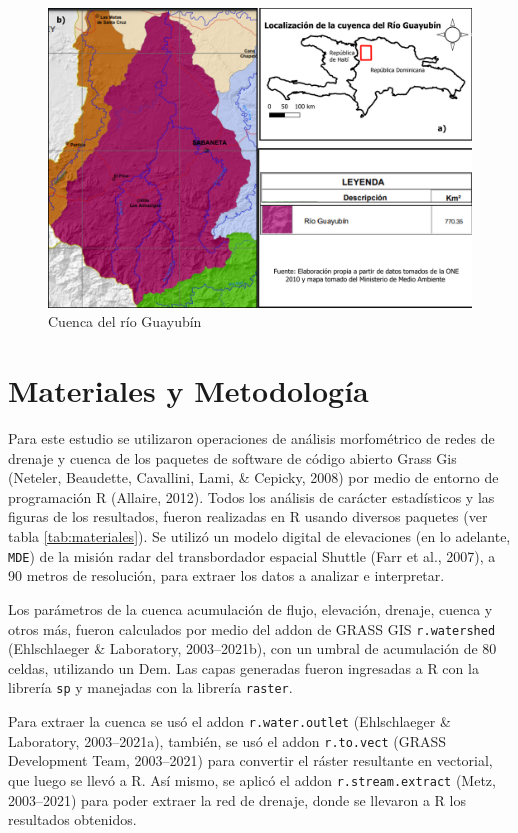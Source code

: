 \documentclass[11pt,]{article}
\begin{document}
\begin{figure}
\centering
\includegraphics[width=1.00000\textwidth]{Mapa final.png}
\caption{Cuenca del río Guayubín\label{mapacuenca}}
\end{figure}

\section{Materiales y Metodología}\label{materiales-y-metodologuxeda}

Para este estudio se utilizaron operaciones de análisis morfométrico de
redes de drenaje y cuenca de los paquetes de software de código abierto
Grass Gis (Neteler, Beaudette, Cavallini, Lami, \& Cepicky, 2008) por
medio de entorno de programación R (Allaire, 2012). Todos los análisis
de carácter estadísticos y las figuras de los resultados, fueron
realizadas en R usando diversos paquetes (ver tabla
\ref{tab:materiales}). Se utilizó un modelo digital de elevaciones (en
lo adelante, \texttt{MDE}) de la misión radar del transbordador espacial
Shuttle (Farr et al., 2007), a 90 metros de resolución, para extraer los
datos a analizar e interpretar.

Los parámetros de la cuenca acumulación de flujo, elevación, drenaje,
cuenca y otros más, fueron calculados por medio del addon de GRASS GIS
\texttt{r.watershed} (Ehlschlaeger \& Laboratory, 2003--2021b), con un
umbral de acumulación de 80 celdas, utilizando un Dem. Las capas
generadas fueron ingresadas a R con la librería \texttt{sp} y manejadas
con la librería \texttt{raster}.

Para extraer la cuenca se usó el addon \texttt{r.water.outlet}
(Ehlschlaeger \& Laboratory, 2003--2021a), también, se usó el addon
\texttt{r.to.vect} (GRASS Development Team, 2003--2021) para convertir
el ráster resultante en vectorial, que luego se llevó a R. Así mismo, se
aplicó el addon \texttt{r.stream.extract} (Metz, 2003--2021) para poder
extraer la red de drenaje, donde se llevaron a R los resultados
obtenidos.
\end{document}
